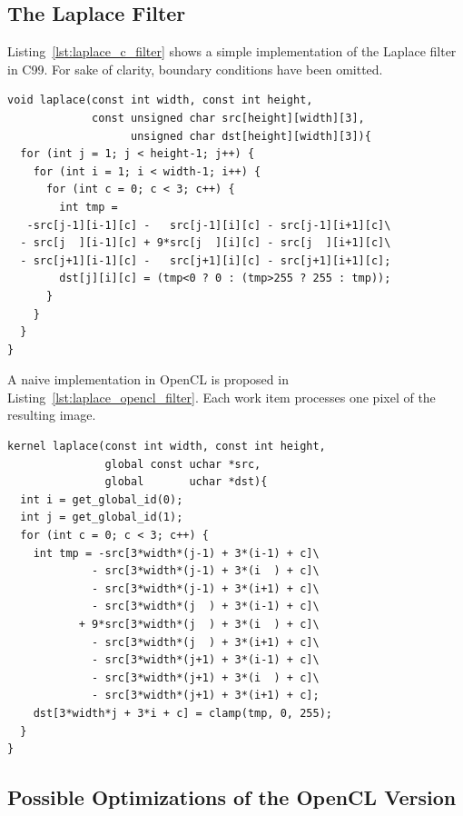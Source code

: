 \documentclass{IEEEtran}
\begin{document}
\subsection{The Laplace Filter}

Listing~\ref{lst:laplace_c_filter} shows a simple implementation of the Laplace
filter in C99. For sake of clarity, boundary conditions have been omitted.

\begin{lstlisting}
void laplace(const int width, const int height,
             const unsigned char src[height][width][3],
                   unsigned char dst[height][width][3]){
  for (int j = 1; j < height-1; j++) {
    for (int i = 1; i < width-1; i++) {
      for (int c = 0; c < 3; c++) {
        int tmp =
   -src[j-1][i-1][c] -   src[j-1][i][c] - src[j-1][i+1][c]\
  - src[j  ][i-1][c] + 9*src[j  ][i][c] - src[j  ][i+1][c]\
  - src[j+1][i-1][c] -   src[j+1][i][c] - src[j+1][i+1][c];
        dst[j][i][c] = (tmp<0 ? 0 : (tmp>255 ? 255 : tmp));
      }
    }
  }
}
\end{lstlisting}

A naive implementation in OpenCL is proposed in
Listing~\ref{lst:laplace_opencl_filter}. Each work item processes one pixel of
the resulting image.

\begin{lstlisting}
kernel laplace(const int width, const int height,
               global const uchar *src,
               global       uchar *dst){
  int i = get_global_id(0);
  int j = get_global_id(1);
  for (int c = 0; c < 3; c++) {
    int tmp = -src[3*width*(j-1) + 3*(i-1) + c]\
             - src[3*width*(j-1) + 3*(i  ) + c]\
             - src[3*width*(j-1) + 3*(i+1) + c]\
             - src[3*width*(j  ) + 3*(i-1) + c]\
           + 9*src[3*width*(j  ) + 3*(i  ) + c]\
             - src[3*width*(j  ) + 3*(i+1) + c]\
             - src[3*width*(j+1) + 3*(i-1) + c]\
             - src[3*width*(j+1) + 3*(i  ) + c]\
             - src[3*width*(j+1) + 3*(i+1) + c];
    dst[3*width*j + 3*i + c] = clamp(tmp, 0, 255);
  }
}
\end{lstlisting}

\subsection{Possible Optimizations of the OpenCL Version}
\end{document}
